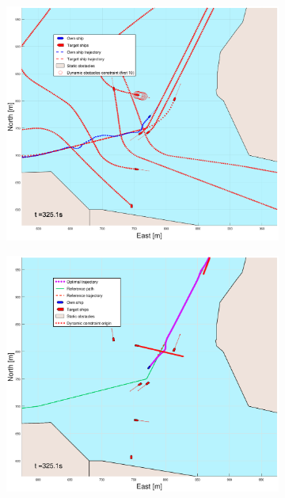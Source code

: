 \begin{figure}[ht!]
\begin{subfigure}[b]{0.499\textwidth}
    \end{subfigure}
    \hfill
    \\
    \begin{subfigure}[b]{0.49\textwidth}
        \centering
        \includegraphics[width=\textwidth]{Images/Figures/Trheimfjord/_Simple_1fig1_time=325}
    \end{subfigure}
    \hfill
    \begin{subfigure}[b]{0.499\textwidth}
        \centering
        \includegraphics[width=\textwidth]{Images/Figures/Trheimfjord/_Simple_1fig999_time=325}

\end{subfigure}
\end{figure}
